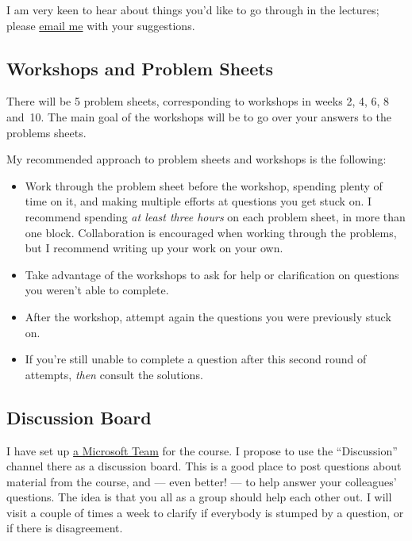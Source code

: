 \documentclass[
  a4paper,
]{article}
\providecommand{\tightlist}{%
  \setlength{\itemsep}{0pt}\setlength{\parskip}{0pt}}
\theoremstyle{definition}
\theoremstyle{definition}
\theoremstyle{definition}
\theoremstyle{definition}
\theoremstyle{remark}
\begin{document}
I am very keen to hear about things you'd like to go through in the
lectures; please \href{mailto:J.Voss@leeds.ac.uk}{email me} with your
suggestions.

\hypertarget{workshops}{%
\subsection*{Workshops and Problem Sheets}\label{workshops}}

There will be 5 problem sheets, corresponding to workshops in weeks 2,
4, 6, 8 and~10. The main goal of the workshops will be to go over
your answers to the problems sheets.

My recommended approach to problem sheets and workshops is the following:

\begin{itemize}
\tightlist
\item
  Work through the problem sheet before the workshop, spending plenty
  of time on it, and making multiple efforts at questions you get
  stuck on. I recommend spending \emph{at least three hours} on each
  problem sheet, in more than one block. Collaboration is encouraged
  when working through the problems, but I recommend writing up your
  work on your own.
\item
  Take advantage of the workshops to ask for help or clarification on
  questions you weren't able to complete.
\item
  After the workshop, attempt again the questions you were previously stuck on.
\item
  If you're still unable to complete a question after this second
  round of attempts, \emph{then} consult the solutions.
\end{itemize}

\hypertarget{teams}{%
\subsection*{Discussion Board}\label{teams}}

I have set up \href{https://teams.microsoft.com/l/team/19\%3aopeKURHGjduA41CDtQUkmDjoPalh-zWDGuKhTk9zYq41\%40thread.tacv2/conversations?groupId=bde4675f-2c0d-4efd-9762-748cca83f4c4\&tenantId=bdeaeda8-c81d-45ce-863e-5232a535b7cb}{a Microsoft
Team}
for the course. I propose to use the ``Discussion'' channel there as a
discussion board. This is a good place to post questions about
material from the course, and --- even better! --- to help answer your
colleagues' questions. The idea is that you all as a group should help
each other out. I will visit a couple of times a week to clarify if
everybody is stumped by a question, or if there is disagreement.
\end{document}
